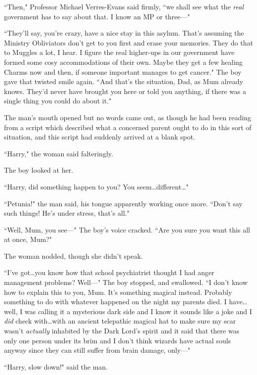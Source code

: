 ``Then," Professor Michael Verres-Evans said firmly, ``we shall see what the \emph{real} government has to say about that. I know an MP or three—"

``They'll say, you're crazy, have a nice stay in this asylum. That's assuming the Ministry Obliviators don't get to you first and erase your memories. They do that to Muggles a lot, I hear. I figure the real higher-ups in our government have formed some cosy accommodations of their own. Maybe they get a few healing Charms now and then, if someone important manages to get cancer." The boy gave that twisted smile again. ``And that's the situation, Dad, as Mum already knows. They'd never have brought you here or told you anything, if there was a single thing you could do about it."

The man's mouth opened but no words came out, as though he had been reading from a script which described what a concerned parent ought to do in this sort of situation, and this script had suddenly arrived at a blank spot.

``Harry," the woman said falteringly.

The boy looked at her.

``Harry, did something happen to you? You seem…different…"

``Petunia!" the man said, his tongue apparently working once more. ``Don't say such things! He's under stress, that's all."

``Well, Mum, you see—" The boy's voice cracked. ``Are you sure you want this all at once, Mum?"

The woman nodded, though she didn't speak.

``I've got…you know how that school psychiatrist thought I had anger management problems? Well—" The boy stopped, and swallowed. ``I don't know how to explain this to you, Mum. It's something magical instead. Probably something to do with whatever happened on the night my parents died. I have…well, I was calling it a mysterious dark side and I know it sounds like a joke and I \emph{did} check with…with an ancient telepathic magical hat to make sure my scar wasn't \emph{actually} inhabited by the Dark Lord's spirit and it said that there was only one person under its brim and I don't think wizards have actual souls anyway since they can still suffer from brain damage, only—"

``Harry, slow down!" said the man.

